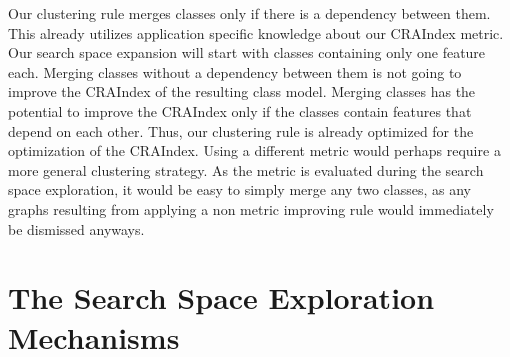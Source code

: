 \documentclass[submission,copyright,creativecommons]{eptcs}
\begin{document}
Our clustering rule merges classes only if there is a dependency between them. 
This already utilizes application specific knowledge about our CRAIndex metric. Our 
search space expansion will start with classes containing only one feature each. Merging 
classes without a dependency between them is not going to improve the CRAIndex of 
the resulting class model. Merging classes has the potential to improve the CRAIndex only 
if the classes contain features that depend on each other. Thus, our clustering rule 
is already optimized for the optimization of the CRAIndex. Using a different metric would 
perhaps require a more general clustering strategy. As the metric is evaluated 
during the search space exploration, it would be easy to simply merge any two 
classes, as any graphs resulting from applying a non metric improving rule 
would immediately be dismissed anyways.


\section{The Search Space Exploration Mechanisms}
\label{sec:expansion}
\end{document}
